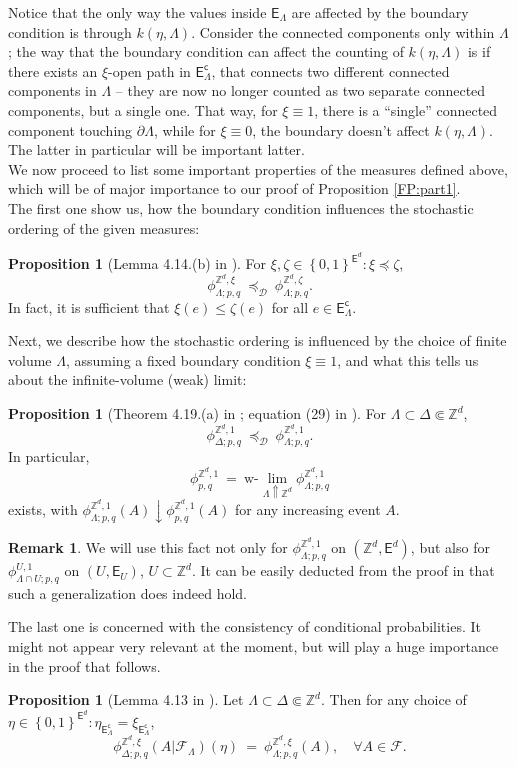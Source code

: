 \documentclass[12pt]{article}
\newcommand{\D}{\mathcal{D}}
\newcommand{\E}{\mathsf{E}}
\newcommand{\F}{\mathcal{F}}
\newcommand{\Z}{\mathbb{Z}}
\newcommand{\set}[1]{\left\{#1\right\}}
\newcommand{\1}{\mathbbm{1}}
\renewcommand{\c}{\mathsf{c}}
\newcommand{\5}{\vspace{0.5cm}}
\theoremstyle{definition}
\newtheorem{prop}[thm]{Proposition}
\newtheorem{rem}[thm]{Remark}
\begin{document}
Notice that the only way the values inside $\E_\Lambda$ are affected by the boundary condition is through $k(\eta,\Lambda)$. Consider the connected components only within $\Lambda$; the way that the boundary condition can affect the counting of $k(\eta,\Lambda)$ is if there exists an $\xi$-open path in $\E_\Lambda^\c$, that connects two different connected components in $\Lambda$ -- they are now no longer counted as two separate connected components, but a single one. That way, for $\xi\equiv 1$, there is a ``single'' connected component touching $\partial\Lambda$, while for $\xi\equiv 0$, the boundary doesn't affect $k(\eta,\Lambda)$. The latter in particular will be important latter. \\

We now proceed to list some important properties of the measures defined above, which will be of major importance to our proof of Proposition \ref{FP:part1}.  \\

The first one show us, how the boundary condition influences the stochastic ordering of the given measures:
\begin{prop}[Lemma 4.14.(b) in \cite{Gri}]\label{RC:boundarydomination}
For $\xi,\zeta\in\set{0,1}^{\E^d}:\xi\preceq\zeta$,
$$\phi_{\Lambda;p,q}^{\Z^d,\xi} ~\preceq_\D~ \phi_{\Lambda;p,q}^{\Z^d,\zeta}.$$
In fact, it is sufficient that $\xi(e)\leq\zeta(e)$ for all $e\in\E_\Lambda^\c$.
\end{prop}

Next, we describe how the stochastic ordering is influenced by the choice of finite volume $\Lambda$, assuming a fixed boundary condition $\xi\equiv 1$, and what this tells us about the infinite-volume (weak) limit:
\begin{prop}[Theorem 4.19.(a) in \cite{Gri}; equation (29) in \cite{GHM}]\label{RC:decr converg}
For $\Lambda\subset\Delta\Subset\Z^d$,
$$\phi_{\Delta;p,q}^{\Z^d,1} ~\preceq_\D~ \phi_{\Lambda;p,q}^{\Z^d,1}.$$
In particular,
$$\phi_{p,q}^{\Z^d,1} ~=~ \text{w-}\!\!\lim_{\Lambda\Uparrow\Z^d}\phi_{\Lambda;p,q}^{\Z^d,1}$$
exists, with $\phi_{\Lambda;p,q}^{\Z^d,1}(A)\downarrow\phi_{p,q}^{\Z^d,1}(A)$ for any increasing event $A$.
\end{prop}
\begin{rem}
We will use this fact not only for $\phi_{\Lambda;p,q}^{\Z^d,1}$ on $(\Z^d,\E^d)$, but also for $\phi_{\Lambda\cap U;p,q}^{U,1}$ on $(U,\E_U)$, $U\subset\Z^d$. It can be easily deducted from the proof in \cite{Gri} that such a generalization does indeed hold.
\end{rem}
The last one is concerned with the consistency of conditional probabilities. It might not appear very relevant at the moment, but will play a huge importance in the proof that follows.
\begin{prop}[Lemma 4.13 in \cite{Gri}]\label{RC:conditionalconsisteny}
Let $\Lambda\subset\Delta\Subset\Z^d$. Then for any choice of $\eta\in\set{0,1}^{\E^d}:\eta_{\E_\Lambda^\c}=\xi_{\E_\Lambda^\c}$,
$$\phi_{\Delta;p,q}^{\Z^d,\xi}(A|\F_\Lambda)(\eta) ~=~ \phi_{\Lambda;p,q}^{\Z^d,\xi}(A), \quad \forall A\in\F.$$
\end{prop}
\end{document}
